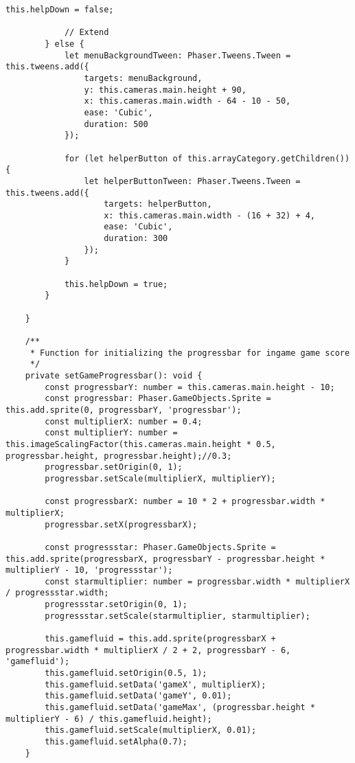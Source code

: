 \begin{lstlisting}[style=TypeScript, caption={gameScene.ts}]
            this.helpDown = false;

            // Extend
        } else {
            let menuBackgroundTween: Phaser.Tweens.Tween = this.tweens.add({
                targets: menuBackground,
                y: this.cameras.main.height + 90,
                x: this.cameras.main.width - 64 - 10 - 50,
                ease: 'Cubic',
                duration: 500
            });

            for (let helperButton of this.arrayCategory.getChildren()) {
                let helperButtonTween: Phaser.Tweens.Tween = this.tweens.add({
                    targets: helperButton,
                    x: this.cameras.main.width - (16 + 32) + 4,
                    ease: 'Cubic',
                    duration: 300
                });
            }

            this.helpDown = true;
        }

    }

    /**
     * Function for initializing the progressbar for ingame game score
     */
    private setGameProgressbar(): void {
        const progressbarY: number = this.cameras.main.height - 10;
        const progressbar: Phaser.GameObjects.Sprite = this.add.sprite(0, progressbarY, 'progressbar');
        const multiplierX: number = 0.4;
        const multiplierY: number = this.imageScalingFactor(this.cameras.main.height * 0.5, progressbar.height, progressbar.height);//0.3;
        progressbar.setOrigin(0, 1);
        progressbar.setScale(multiplierX, multiplierY);

        const progressbarX: number = 10 * 2 + progressbar.width * multiplierX;
        progressbar.setX(progressbarX);

        const progressstar: Phaser.GameObjects.Sprite = this.add.sprite(progressbarX, progressbarY - progressbar.height * multiplierY - 10, 'progressstar');
        const starmultiplier: number = progressbar.width * multiplierX / progressstar.width;
        progressstar.setOrigin(0, 1);
        progressstar.setScale(starmultiplier, starmultiplier);

        this.gamefluid = this.add.sprite(progressbarX + progressbar.width * multiplierX / 2 + 2, progressbarY - 6, 'gamefluid');
        this.gamefluid.setOrigin(0.5, 1);
        this.gamefluid.setData('gameX', multiplierX);
        this.gamefluid.setData('gameY', 0.01);
        this.gamefluid.setData('gameMax', (progressbar.height * multiplierY - 6) / this.gamefluid.height);
        this.gamefluid.setScale(multiplierX, 0.01);
        this.gamefluid.setAlpha(0.7);
    }


\end{lstlisting}
